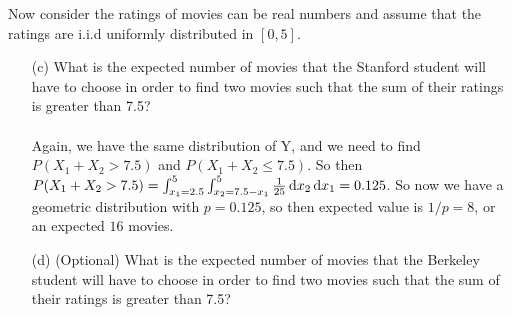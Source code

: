 \begin{enumerate}
    Now consider the ratings of movies can be real numbers and assume that the ratings are i.i.d uniformly distributed in $[0,5]$.
    \begin{enumerate}
      \item [(c)] What is the expected number of movies that the Stanford student will have to choose in order to find two movies such that the sum of their ratings is greater than 7.5?\\\\

        Again, we have the same distribution of Y, and we need to find $P(X_1 + X_2 > 7.5)$ and $P(X_1 + X_2 \leq 7.5)$.
        So then $P(X_1 + X_2 > 7.5) = \int_{x_1=2.5}^5 \int_{x_2=7.5-x_1}^5 \frac{1}{25} \operatorname{d}\!{x_2} \operatorname{d}\!{x_1} = 0.125$. So now we have a geometric distribution with $p = 0.125$, so then expected value is $1/p = 8$, or an expected $16$ movies.
      \item [(d)] (Optional) What is the expected number of movies that the Berkeley student will have to choose in order to find two movies such that the sum of their ratings is greater than 7.5?
    \end{enumerate}
      
\end{enumerate}


